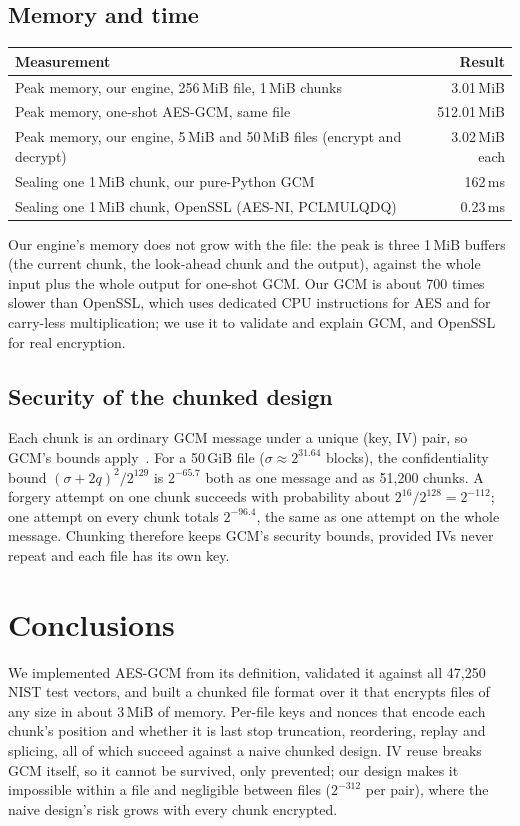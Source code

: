 \documentclass[11pt,a4paper]{article}
\begin{document}
\subsection{Memory and time}
\begin{center}
\begin{tabular}{lr}
\toprule
Measurement & Result\\
\midrule
Peak memory, our engine, 256\,MiB file, 1\,MiB chunks & 3.01\,MiB\\
Peak memory, one-shot AES-GCM, same file & 512.01\,MiB\\
Peak memory, our engine, 5\,MiB and 50\,MiB files (encrypt and decrypt) & 3.02\,MiB each\\
Sealing one 1\,MiB chunk, our pure-Python GCM & 162\,ms\\
Sealing one 1\,MiB chunk, OpenSSL (AES-NI, PCLMULQDQ) & 0.23\,ms\\
\bottomrule
\end{tabular}
\end{center}
Our engine's memory does not grow with the file: the peak is three 1\,MiB buffers (the current chunk, the look-ahead chunk and the output), against the whole input plus the whole output for one-shot GCM. Our GCM is about 700 times slower than OpenSSL, which uses dedicated CPU instructions for AES and for carry-less multiplication; we use it to validate and explain GCM, and OpenSSL for real encryption.

\subsection{Security of the chunked design}
Each chunk is an ordinary GCM message under a unique (key, IV) pair, so GCM's bounds apply~\cite{mv-sec}. For a 50\,GiB file ($\sigma \approx 2^{31.64}$ blocks), the confidentiality bound $(\sigma+2q)^2/2^{129}$ is $2^{-65.7}$ both as one message and as 51,200 chunks. A forgery attempt on one chunk succeeds with probability about $2^{16}/2^{128} = 2^{-112}$; one attempt on every chunk totals $2^{-96.4}$, the same as one attempt on the whole message. Chunking therefore keeps GCM's security bounds, provided IVs never repeat and each file has its own key.

\section{Conclusions}
We implemented AES-GCM from its definition, validated it against all 47,250 NIST test vectors, and built a chunked file format over it that encrypts files of any size in about 3\,MiB of memory. Per-file keys and nonces that encode each chunk's position and whether it is last stop truncation, reordering, replay and splicing, all of which succeed against a naive chunked design. IV reuse breaks GCM itself, so it cannot be survived, only prevented; our design makes it impossible within a file and negligible between files ($2^{-312}$ per pair), where the naive design's risk grows with every chunk encrypted.
\end{document}
